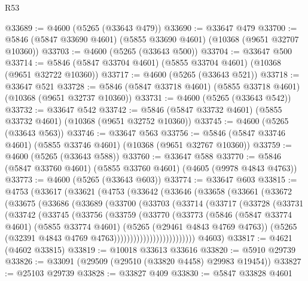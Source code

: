 \begin{lexlean}{R53}
\begin{coremodule}
@33689 := @4600 (@5265 (@33643 @479))
@33690 := @33647 @479
@33700 := @5846 (@5847 @33690 @4601) (@5855 @33690 @4601) (@10368 (@9651 @32707 @10360))
@33703 := @4600 (@5265 (@33643 @500))
@33704 := @33647 @500
@33714 := @5846 (@5847 @33704 @4601) (@5855 @33704 @4601) (@10368 (@9651 @32722 @10360))
@33717 := @4600 (@5265 (@33643 @521))
@33718 := @33647 @521
@33728 := @5846 (@5847 @33718 @4601) (@5855 @33718 @4601) (@10368 (@9651 @32737 @10360))
@33731 := @4600 (@5265 (@33643 @542))
@33732 := @33647 @542
@33742 := @5846 (@5847 @33732 @4601) (@5855 @33732 @4601) (@10368 (@9651 @32752 @10360))
@33745 := @4600 (@5265 (@33643 @563))
@33746 := @33647 @563
@33756 := @5846 (@5847 @33746 @4601) (@5855 @33746 @4601) (@10368 (@9651 @32767 @10360))
@33759 := @4600 (@5265 (@33643 @588))
@33760 := @33647 @588
@33770 := @5846 (@5847 @33760 @4601) (@5855 @33760 @4601) (@4605 (@9978 @4843 @4763))
@33773 := @4600 (@5265 (@33643 @603))
@33774 := @33647 @603
@33815 := @4753
    (@33617
      (@33621
        (@4753
          (@33642
            (@33646
              (@33658
                (@33661
                  (@33672
                    (@33675
                      (@33686
                        (@33689
                          (@33700
                            (@33703
                              (@33714
                                (@33717
                                  (@33728
                                    (@33731
                                      (@33742
                                        (@33745
                                          (@33756
                                            (@33759
                                              (@33770
                                                (@33773
                                                  (@5846
                                                    (@5847 @33774 @4601)
                                                    (@5855 @33774 @4601)
                                                    (@5265 (@29461 @4843 @4769 @4763))
                                                    (@5265
                                                      (@32391
                                                        @4843
                                                        @4769
                                                        @4763)))))))))))))))))))))))))
      @4603)
@33817 := @4621 (@4602 @33815)
@33819 := @10018 @33613 @33616
@33820 := @5910 @29739
@33826 := @33091 (@29509 (@29510 (@33820 @4458) @29983 @19454))
@33827 := @25103 @29739
@33828 := @33827 @409
@33830 := @5847 @33828 @4601

\end{coremodule}
\end{lexlean}
